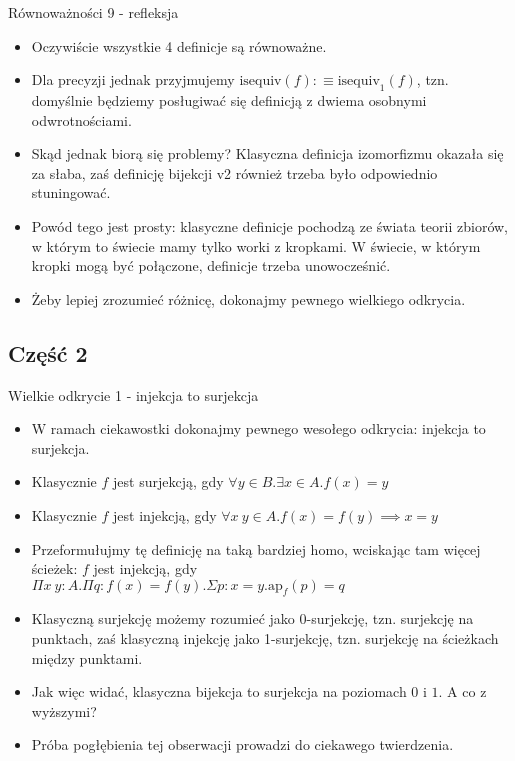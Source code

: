 \documentclass{beamer}
\newcommand{\defn}{:\equiv}
\newcommand{\ap}[2]{\text{ap}_{#1}(#2)}
\newcommand{\isequiv}{\text{isequiv}}
\begin{document}
\begin{frame}{Równoważności 9 - refleksja}
\begin{itemize}
	\item Oczywiście wszystkie 4 definicje są równoważne.
	\item Dla precyzji jednak przyjmujemy $\isequiv(f) \defn \isequiv_1(f)$, tzn. domyślnie będziemy posługiwać się definicją z dwiema osobnymi odwrotnościami.
	\item Skąd jednak biorą się problemy? Klasyczna definicja izomorfizmu okazała się za słaba, zaś definicję bijekcji v2 również trzeba było odpowiednio stuningować.
	\item Powód tego jest prosty: klasyczne definicje pochodzą ze świata teorii zbiorów, w którym to świecie mamy tylko worki z kropkami. W świecie, w którym kropki mogą być połączone, definicje trzeba unowocześnić.
	\item Żeby lepiej zrozumieć różnicę, dokonajmy pewnego wielkiego odkrycia.
\end{itemize}
\end{frame}

\subsection{Część 2}

\begin{frame}{Wielkie odkrycie 1 - injekcja to surjekcja}
\begin{itemize}
	\item W ramach ciekawostki dokonajmy pewnego wesołego odkrycia: injekcja to surjekcja.
	\item Klasycznie $f$ jest surjekcją, gdy $\forall y \in B. \exists x \in A. f(x) = y$
	\item Klasycznie $f$ jest injekcją, gdy $\forall x\ y \in A. f(x) = f(y) \implies x = y$
	\item Przeformułujmy tę definicję na taką bardziej homo, wciskając tam więcej ścieżek: $f$ jest injekcją, gdy $\Pi x\ y : A. \Pi q : f(x) = f(y). \Sigma p : x = y. \ap{f}{p} = q$
	\item Klasyczną surjekcję możemy rozumieć jako 0-surjekcję, tzn. surjekcję na punktach, zaś klasyczną injekcję jako 1-surjekcję, tzn. surjekcję na ścieżkach między punktami.
	\item Jak więc widać, klasyczna bijekcja to surjekcja na poziomach $0$ i $1$. A co z wyższymi?
	\item Próba pogłębienia tej obserwacji prowadzi do ciekawego twierdzenia.
\end{itemize}
\end{frame}
\end{document}
